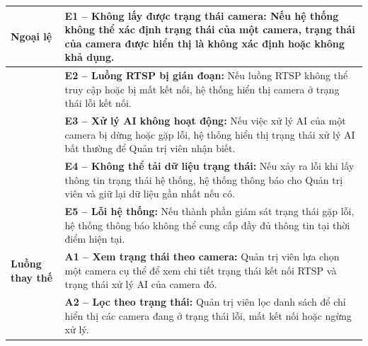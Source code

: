\begin{longtable}{|>{\raggedright\arraybackslash}p{2.9cm}|p{12.3cm}|}
\textbf{Ngoại lệ} & \textbf{E1 -- Không lấy được trạng thái camera:} Nếu hệ thống không thể xác định trạng thái của một camera, trạng thái của camera được hiển thị là không xác định hoặc không khả dụng. \\ \cline{2-2}
 & \textbf{E2 -- Luồng RTSP bị gián đoạn:} Nếu luồng RTSP không thể truy cập hoặc bị mất kết nối, hệ thống hiển thị camera ở trạng thái lỗi kết nối. \\ \cline{2-2}
 & \textbf{E3 -- Xử lý AI không hoạt động:} Nếu việc xử lý AI của một camera bị dừng hoặc gặp lỗi, hệ thống hiển thị trạng thái xử lý AI bất thường để Quản trị viên nhận biết. \\ \cline{2-2}
 & \textbf{E4 -- Không thể tải dữ liệu trạng thái:} Nếu xảy ra lỗi khi lấy thông tin trạng thái hệ thống, hệ thống thông báo cho Quản trị viên và giữ lại dữ liệu gần nhất nếu có. \\ \cline{2-2}
 & \textbf{E5 -- Lỗi hệ thống:} Nếu thành phần giám sát trạng thái gặp lỗi, hệ thống thông báo không thể cung cấp đầy đủ thông tin tại thời điểm hiện tại. \\ \hline
\textbf{Luồng thay thế} & \textbf{A1 -- Xem trạng thái theo camera:} Quản trị viên lựa chọn một camera cụ thể để xem chi tiết trạng thái kết nối RTSP và trạng thái xử lý AI của camera đó. \\ \cline{2-2}
 & \textbf{A2 -- Lọc theo trạng thái:} Quản trị viên lọc danh sách để chỉ hiển thị các camera đang ở trạng thái lỗi, mất kết nối hoặc ngừng xử lý. \\ \hline
\end{longtable}

